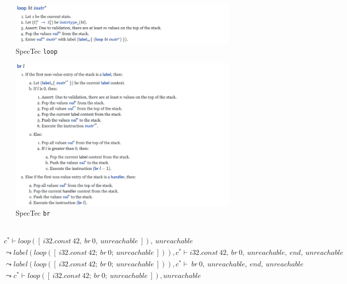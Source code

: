 \begin{figure}[h!]
    \centerline{\includegraphics[width=15cm]{fig/spectec-loop}}
    \caption[Enter the caption title here]{SpecTec \texttt{loop}} \label{fig:spectec-loop}
\end{figure}
\begin{figure}[h!]
    \centerline{\includegraphics[width=15cm]{fig/spectec-br}}
    \caption[Enter the caption title here]{SpecTec \texttt{br}} \label{fig:spectec-br}
\end{figure}

 \\
\begin{align}
  &c^*
  \vdash
  loop([ ~ i32.const ~ 42, ~ br ~ 0, ~ unreachable ~ ]), ~ unreachable
  \label{eq:loop-1} \\
&\leadsto
  label(loop([ ~ i32.const ~ 42; ~ br ~ 0; ~ unreachable ~ ])), c^*
  \vdash
  i32.const ~ 42, ~ br ~ 0, ~ unreachable, ~ end, ~ unreachable
  \label{eq:loop-2} \\
  &\leadsto
  label(loop([ ~ i32.const ~ 42; ~ br ~ 0; ~ unreachable ~ ])), c^*
  \vdash
  ~ br ~ 0, ~ unreachable, ~ end, ~ unreachable
  \label{eq:loop-3} \\
&\leadsto
  c^*
  \vdash
  loop([ ~ i32.const ~ 42; ~ br ~ 0; ~ unreachable ~ ]), unreachable
  \label{eq:loop-4}
\end{align}

